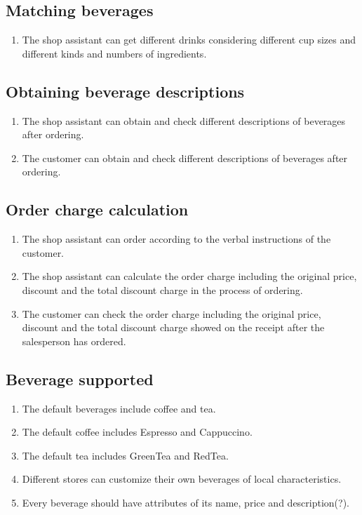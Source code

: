 \documentclass[a4paper]{report}
\begin{document}
\subsection{Matching beverages}

\begin{enumerate}
\item The shop assistant can get different drinks considering different cup sizes and different kinds and numbers of ingredients.
\end{enumerate}

\subsection{Obtaining beverage descriptions}
\begin{enumerate}
\item The shop assistant can obtain and check different descriptions of beverages after ordering.
\item The customer can obtain and check different descriptions of beverages after ordering.
\end{enumerate}

\subsection{Order charge calculation}
\begin{enumerate}
\item The shop assistant can order according to the verbal instructions of the customer.
\item The shop assistant can calculate the order charge including the original price, discount and the total discount charge in the process of ordering.
\item The customer can check the order charge including the original price, discount and the total discount charge showed on the receipt after the salesperson has ordered.
\end{enumerate}

\subsection{Beverage supported}
\begin{enumerate}
\item The default beverages include coffee and tea.
\item The default coffee includes Espresso and Cappuccino.
\item The default tea includes GreenTea and RedTea.
\item Different stores can customize their own beverages of local characteristics.
\item Every beverage should have attributes of its name, price and description(?).

\end{enumerate}
\end{document}
